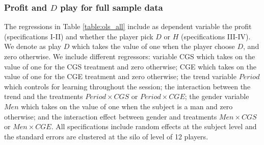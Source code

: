 \documentclass[12pt, letterpaper]{article}
\theoremstyle{plain}
\begin{document}
\subsubsection*{Profit and $D$ play for full sample data}
The regressions in Table \ref{table:ols_all} include as dependent variable the profit (specifications I-II) and whether the player pick $D$ or $H$ (specifications III-IV). We denote as play $D$ which takes the value of one when the player choose $D$, and zero otherwise. We include different regressors: variable CGS which takes on the value of one for the CGS treatment and zero otherwise; CGE which takes on the value of one for the CGE treatment and zero otherwise; the trend variable $Period$ which controls for learning throughout the session; the interaction between the trend and the treatments $Period \times CGS$ or $Period \times CGE$; the gender variable $Men$ which takes on the value of one when the subject is a man and zero otherwise; and the interaction effect between gender and treatments $Men \times CGS$ or $Men \times CGE$. All specifications include random effects at the subject level and the standard errors are clustered at the silo of level of 12 players.  
\end{document}
